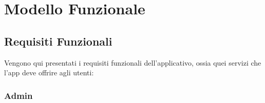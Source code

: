 \section{Modello Funzionale}
    \subsection{Requisiti Funzionali}
        \begin{flushleft}  
            {\large
                Vengono qui presentati i requisiti funzionali dell'applicativo, ossia quei servizi che l'app  deve offrire agli utenti:
            } 
        \end{flushleft}
        
        \subsubsection{Admin}
        

